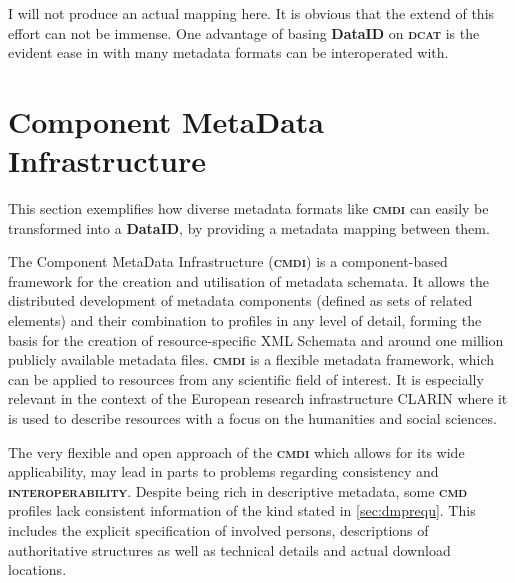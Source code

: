 \documentclass[a4paper,english,twoside,BCOR1.5cm,headsepline,DIV12,appendixprefix,final,12pt]{scrbook}
\newcommand{\extensibility}{{\ttfamily\scshape\bfseries extensibility}\xspace}
\newcommand{\interoperability}{{\ttfamily\scshape\bfseries interoperability}\xspace}
\newcommand{\dataid}{{\ttfamily\bfseries DataID}\xspace}
\newcommand{\cmdi}{{\scshape\bfseries cmdi}\xspace}
\newcommand{\cmd}{{\scshape\bfseries cmd}\xspace}
\newcommand{\dcat}{{\scshape\bfseries dcat}\xspace}
\begin{document}
I will not produce an actual mapping here. It is obvious that the extend of this effort can not be immense. One advantage of basing \dataid on \dcat is the evident ease in with many metadata formats can be interoperated with.

\pagebreak
\section{Component MetaData Infrastructure} 
\label{sec:mapcmdi}
This section exemplifies how diverse metadata formats like \cmdi can easily be transformed into a \dataid, by providing a metadata mapping between them. 

The Component MetaData Infrastructure (\cmdi) is a component-based framework for the creation and utilisation of metadata schemata\cite{BROEDER10.163}. It allows the distributed development of metadata components (defined as sets of related elements) and their combination to profiles in any level of detail, forming the basis for the creation of resource-specific XML Schemata and around one million publicly available metadata files. \cmdi is a flexible metadata framework, which can be applied to resources from any scientific field of interest. It is especially relevant in the context of the European research infrastructure CLARIN\cite{Hinrichs2014} where it is used to describe resources with a focus on the humanities and social sciences.

The very flexible and open approach of the \cmdi which allows for its wide applicability, may lead in parts to problems regarding
consistency and \interoperability.
Despite being rich in descriptive metadata, some \cmd profiles lack consistent information of the kind stated in \cref{sec:dmprequ}. This includes the explicit specification of involved persons, descriptions of authoritative structures as well as technical details and actual download locations.
\end{document}
